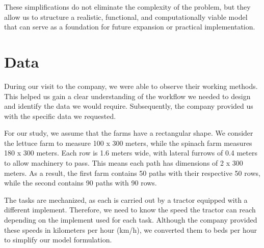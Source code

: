 These simplifications do not eliminate the complexity of the problem, but they allow us to structure a realistic, functional, and computationally viable model that can serve as a foundation for future expansion or practical implementation.


\chapter*{Data}
During our visit to the company, we were able to observe their working methods. This helped us gain a clear understanding of the workflow we needed to design  
and identify the data we would require. Subsequently, the company provided us with the specific data we requested.

For our study, we assume that the farms have a rectangular shape. We consider the lettuce farm to measure 100 x 300 meters,  
while the spinach farm measures 180 x 300 meters. Each row is 1.6 meters wide, with lateral furrows of 0.4 meters to allow machinery to pass.  
This means each path has dimensions of 2 x 300 meters.  
As a result, the first farm contains 50 paths with their respective 50 rows, while the second contains 90 paths with 90 rows.

The tasks are mechanized, as each is carried out by a tractor equipped with a different implement.  
Therefore, we need to know the speed the tractor can reach depending on the implement used for each task.  
Although the company provided these speeds in kilometers per hour (km/h), we converted them to beds per hour to simplify our model formulation.

